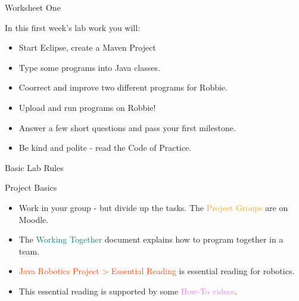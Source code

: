 \documentclass[color=pdftex,usenames,dvipsnames, aspectratio=169]{beamer}
\begin{document}

\begin{frame}{Worksheet One}
\begin{block}{In this first week's lab work you will:}
\begin{itemize}[<+->]
\item Start Eclipse, create a Maven Project
\item Type some programs into Java classes.
\item \alert{Coorrect} and improve two different programs for Robbie.
\item Upload and run programs on Robbie!
\item Answer a few short questions and pass your first milestone.
\item Be kind and polite - read the Code of Practice.
\end{itemize}
\end{block}
\end{frame}


\begin{frame}{Basic Lab Rules}

\begin{block}{Project Basics}
\begin{itemize}[<+->]
\item Work in your group - but divide up the tasks. The  \textcolor{orange}{Project Groups} are on Moodle.
\item The \textcolor{teal}{Working Together} document explains how to program together in a team.
\item \textcolor{OrangeRed}{Java Robotics Project > Essential Reading} is essential reading for robotics.
\item This essential reading is supported by some \textcolor{violet}{How-To videos}.
\end{itemize}
\end{block}
\end{frame}


\end{document}
